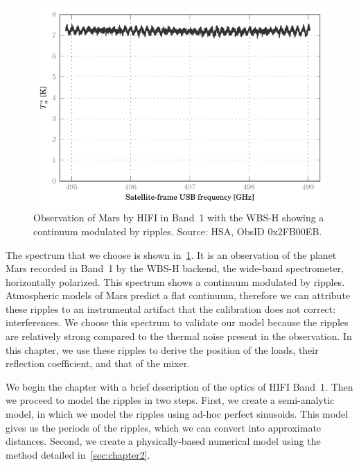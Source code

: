 \begin{figure}[hbtp]
    \centering
    \includegraphics{mars_25_original}
    \caption{Observation of Mars by HIFI in Band~1 with the WBS-H showing a continuum modulated by ripples.
    Source: HSA, ObsID 0x2FB00EB.}
    \label{fig:mars_25_original}
\end{figure}

The spectrum that we choose is shown in~\cref{fig:mars_25_original}.
It is an observation of the planet Mars recorded in Band~1 by the WBS-H backend, the wide-band spectrometer, horizontally polarized.
This spectrum shows a continuum modulated by ripples.
Atmospheric models of Mars predict a flat continuum, therefore we can attribute these ripples to an instrumental artifact that the calibration does not correct: interferences.
We choose this spectrum to validate our model because the ripples are relatively strong compared to the thermal noise present in the observation.
In this chapter, we use these ripples to derive the position of the loads, their reflection coefficient, and that of the mixer.

We begin the chapter with a brief description of the optics of HIFI Band~1.
Then we proceed to model the ripples in two steps.
First, we create a semi-analytic model, in which we model the ripples using ad-hoc perfect sinusoids.
This model gives us the periods of the ripples, which we can convert into approximate distances.
Second, we create a physically-based numerical model using the method detailed in~\cref{sec:chapter2}.


\FloatBarrier



